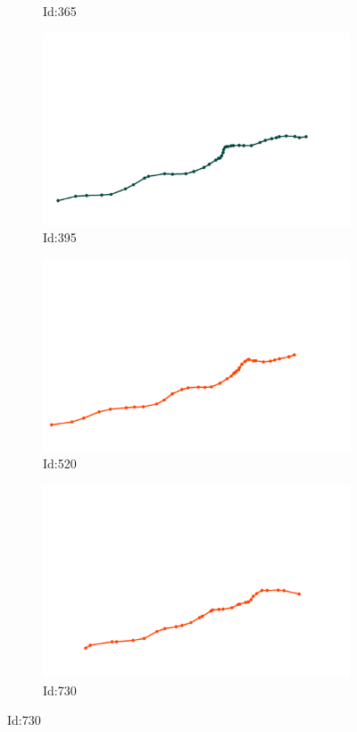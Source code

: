 \documentclass[12pt,twoside]{report}
\begin{document}
\begin{figure}
\begin{subfigure}[b]{0.20\textwidth}
\caption{Id:365}
\end{subfigure}
\begin{subfigure}[b]{0.20\textwidth}
\centering
\includegraphics[width=\textwidth]{../../trajectories/395.png}
\caption{Id:395}
\end{subfigure}
\begin{subfigure}[b]{0.20\textwidth}
\centering
\includegraphics[width=\textwidth]{../../trajectories/520.png}
\caption{Id:520}
\end{subfigure}
\begin{subfigure}[b]{0.20\textwidth}
\centering
\includegraphics[width=\textwidth]{../../trajectories/730.png}
\caption{Id:730}
\end{subfigure}
\end{figure}
\end{document}
